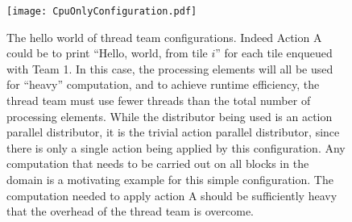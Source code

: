 \documentclass{article}
\begin{document}
\begin{appendices}
\begin{figure}[!ht]
\begin{center}
\texttt{[image: CpuOnlyConfiguration.pdf]}
\caption[]{The hello world of thread team configurations.  Indeed Action A could
be to print ``Hello, world, from tile $i$'' for each tile enqueued with Team 1.
In this case, the processing elements will all be used for ``heavy''
computation, and to achieve runtime efficiency,
the thread team must use fewer threads than the total number of processing
elements.  While the distributor being used is an action parallel distributor,
it is the trivial action parallel distributor, since there is only a single
action being applied by this configuration.  Any computation that needs to be
carried out on all blocks in the domain is a motivating example for this simple
configuration.  The computation needed to apply action A should be
sufficiently heavy that the overhead of the thread team is overcome.}
\label{fig:CpuOnlyConfig}
\end{center}
\end{figure}


\end{appendices}
\end{document}
